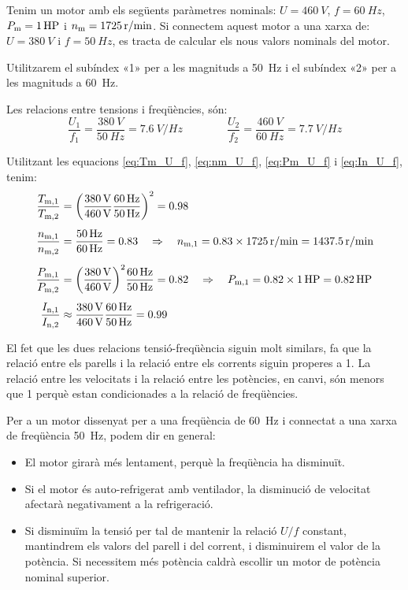 \begin{exemple}[\MotorVarParamTensFreq{}]
	\addcontentsxms{\MotorVarParamTensFreq}
	Tenim un motor amb els següents paràmetres nominals: $U=\qty{460}{V}$, $f=\qty{60}{Hz}$,  $P_\mathrm{m}=\qty{1}{HP}$ i $n_\mathrm{m}=\qty{1725}{r/min}$. Si connectem aquest motor a una xarxa de: $U=\qty{380}{V}$ i $f=\qty{50}{Hz}$, es tracta de calcular els nous valors nominals del motor.
	
	Utilitzarem el subíndex «1» per a les magnituds  a \qty{50}{Hz} i el  subíndex «2» per a les magnituds a \qty{60}{Hz}.
	
	Les relacions entre tensions i freqüències,  són:
	\[
		\frac{U_1}{f_1} = \frac{\qty{380}{V}}{\qty{50}{Hz}} = \qty{7,6}{V/Hz} \qquad \qquad
		\frac{U_2}{f_2} = \frac{\qty{460}{V}}{\qty{60}{Hz}} = \qty{7,7}{V/Hz} 
	\]

	Utilitzant les equacions \eqref{eq:Tm_U_f},  \eqref{eq:nm_U_f}, \eqref{eq:Pm_U_f} i \eqref{eq:In_U_f},  tenim:
	\begin{align*}
		\frac{T_\mathrm{m,1}}{T_\mathrm{m,2}} &= {\left(\frac{\qty{380}{V}}{\qty{460}{V}}\frac{\qty{60}{Hz}}{\qty{50}{Hz}}\right)}^2 = \num{0,98} \\[1ex]
		\frac{n_\mathrm{m,1}}{n_\mathrm{m,2}} &= \frac{\qty{50}{Hz}}{\qty{60}{Hz}} = \num{0,83}  \quad \Rightarrow \quad n_\mathrm{m,1} = \num{0,83} \times \qty{1725}{r/min} = \qty{1437,5}{r/min} \\[1ex]
		\frac{P_\mathrm{m,1}}{P_\mathrm{m,2}} &= {\left(\frac{\qty{380}{V}}{\qty{460}{V}}\right)}^{2} \frac{\qty{60}{Hz}}{\qty{50}{Hz}} = \num{0,82} \quad \Rightarrow \quad P_\mathrm{m,1} = \num{0,82} \times \qty{1}{HP} = \qty{0,82}{HP}\\[1ex]
		\frac{I_\mathrm{n,1}}{I_\mathrm{n,2}} &\approx
		\frac{\qty{380}{V}}{\qty{460}{V}} \frac{\qty{60}{Hz}}{\qty{50}{Hz}} = \num{0,99}
	\end{align*}

	El fet que les dues relacions tensió-freqüència siguin molt similars, fa que la relació entre els parells i la relació entre els corrents siguin properes a 1. La relació entre les velocitats i la relació entre les potències, en canvi, són menors que 1 perquè estan condicionades a la relació de freqüències. 
\end{exemple}

\break
Per a un motor dissenyat per a una freqüència de \qty{60}{Hz} i connectat a una xarxa de freqüència \qty{50}{Hz}, podem dir en general:
\begin{itemize}
	\item El motor girarà més lentament, perquè la freqüència ha disminuït.
	\item Si el motor és auto-refrigerat amb ventilador, la disminució de velocitat afectarà negativament a la refrigeració.
	\item Si disminuïm la tensió  per tal de mantenir la relació $U/f$ constant, mantindrem els valors del parell i del corrent, i disminuirem el valor de la potència. Si necessitem més potència caldrà escollir un motor de potència nominal superior. 	
\end{itemize}

